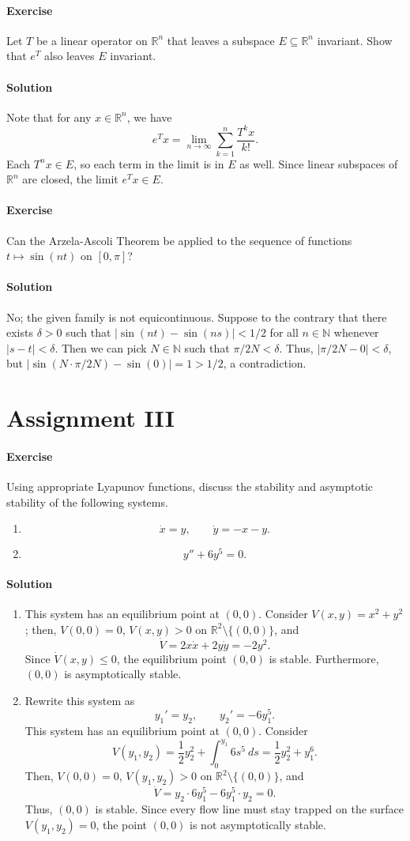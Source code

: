 \documentclass[10pt]{article}
\newcounter{prob}
\newcommand{\problem}{\stepcounter{prob}\paragraph{Exercise \arabic{prob}}}
\newcommand{\solution}{\paragraph{Solution}}
\newcommand{\R}{\mathbb{R}}
\newcommand{\N}{\mathbb{N}}
\begin{document}
    \problem Let $T$ be a linear operator on $\R^n$ that leaves a subspace $E
    \subseteq \R^n$ invariant. Show that $e^T$ also leaves $E$ invariant.

    \solution Note that for any $x \in \R^n$, we have \[
        e^Tx = \lim_{n \to \infty} \sum_{k = 1}^n \frac{T^kx}{k!}.
    \] Each $T^nx \in E$, so each term in the limit is in $E$ as well. Since
    linear subspaces of $\R^n$ are closed, the limit $e^Tx \in E$.


    \problem Can the Arzela-Ascoli Theorem be applied to the sequence of functions
    $t \mapsto \sin(nt)$ on $[0, \pi]$?

    \solution No; the given family is not equicontinuous. Suppose to the contrary
    that there exists $\delta > 0$ such that $|\sin(nt) - \sin(ns)| < 1/2$ for all $n
    \in \N$ whenever $|s - t| < \delta$. Then we can pick $N \in \N$ such that
    $\pi/2N < \delta$. Thus, $|\pi/2N - 0| < \delta$, but $|\sin(N\cdot\pi/2N) -
    \sin(0)| = 1 > 1/2$, a contradiction.



    \section*{Assignment III}
    \setcounter{prob}{0}

    \problem Using appropriate Lyapunov functions, discuss the stability and
    asymptotic stability of the following systems.

    \begin{enumerate}
        \item \[
            \dot{x} = y, \qquad
            \dot{y} = -x - y.
        \]

        \item \[
            y'' + 6y^5 = 0.
        \]
    \end{enumerate}

    \solution \begin{enumerate}
        \item This system has an equilibrium point at $(0, 0)$. Consider $V(x, y) =
        x^2 + y^2$; then, $V(0, 0) = 0$, $V(x, y) > 0$ on $\R^2\setminus\{(0, 0)\}$,
        and \[
            \dot{V} = 2x\dot{x} + 2y\dot{y} = -2y^2.
        \] Since $\dot{V}(x, y) \leq 0$, the equilibrium point $(0, 0)$ is stable.
        Furthermore, $(0, 0)$ is asymptotically stable.

        \item Rewrite this system as \[
            y_1' = y_2, \qquad y_2' = -6y_1^5.
        \] This system has an equilibrium point at $(0, 0)$. Consider \[
            V(y_1, y_2) = \frac{1}{2}y_2^2 + \int_0^{y_1} 6s^5 \:ds =
            \frac{1}{2}y_2^2 + y_1^6.
        \] Then, $V(0, 0) = 0$, $V(y_1, y_2) > 0$ on $\R^2\setminus\{(0, 0)\}$, and
        \[
            \dot{V} = y_2\cdot 6y_1^5 - 6y_1^5 \cdot y_2 = 0.
        \] Thus, $(0, 0)$ is stable. Since every flow line must stay trapped on the
        surface $V(y_1, y_2) = 0$, the point $(0, 0)$ is not asymptotically stable.
    \end{enumerate}
\end{document}
